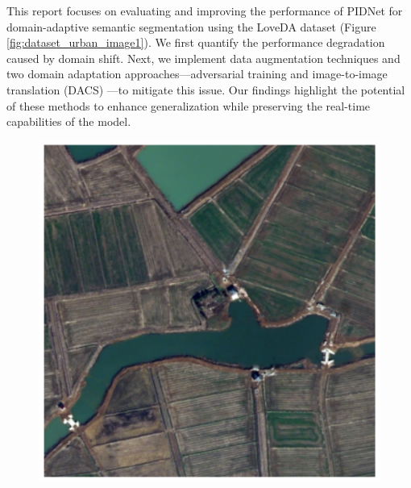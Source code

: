 \documentclass{article}
\begin{document}
\begin{multicols}{2}
		This report focuses on evaluating and improving the performance of PIDNet for domain-adaptive semantic segmentation using the LoveDA dataset \cite{loveda2021} (Figure \ref{fig:dataset_urban_image1}). We first quantify the performance degradation caused by domain shift. Next, we implement data augmentation techniques and two domain adaptation approaches—adversarial training and image-to-image translation (DACS)\cite{tranheden2021dacs} —to mitigate this issue. Our findings highlight the potential of these methods to enhance generalization while preserving the real-time capabilities of the model.
		
		\begin{figure}[H]
			\centering
			\begin{minipage}{0.48\linewidth}
				\centering
				\includegraphics[width=1\linewidth]{image/rural_1.png}


\end{minipage}
\end{figure}
\end{multicols}
\end{document}

